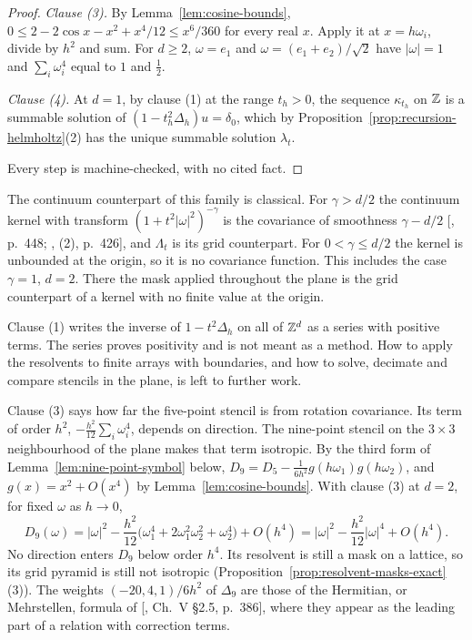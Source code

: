\begin{proof}
\emph{Clause (3).} By Lemma~\ref{lem:cosine-bounds},
$0 \le 2 - 2\cos x - x^2 + x^4/12 \le x^6/360$ for every real $x$. Apply it at $x = h\omega_i$, divide
by $h^2$ and sum. For $d \ge 2$, $\omega = e_1$ and $\omega = (e_1 + e_2)/\sqrt2$ have $|\omega| = 1$
and $\sum_i\omega_i^4$ equal to $1$ and $\tfrac12$.

\emph{Clause (4).} At $d = 1$, by clause (1) at the range $t_h > 0$, the sequence $\kappa_{t_h}$ on
$\mathbb{Z}$ is a summable solution of $(1 - t_h^2\Delta_h)u = \delta_0$, which by
Proposition~\ref{prop:recursion-helmholtz}(2) has the unique summable solution $\lambda_t$.

Every step is machine-checked, with no cited fact.
\end{proof}

The continuum counterpart of this family is classical. For $\gamma > d/2$ the continuum kernel with transform
$(1 + t^2|\omega|^2)^{-\gamma}$ is the \Matern{} covariance of smoothness $\gamma - d/2$
[, p.~448; , (2), p.~426], and $\Lambda_t$ is its grid
counterpart. For $0 < \gamma \le d/2$ the kernel is unbounded at the origin, so it is no covariance
function. This includes the case $\gamma = 1$, $d = 2$. There the mask applied throughout the plane
is the grid counterpart of a kernel with no finite value at the origin.

Clause (1) writes the inverse of $1 - t^2\Delta_h$ on all of $\mathbb{Z}^d$ as a series with positive
terms. The series proves positivity and is not meant as a method. How to apply the resolvents to
finite arrays with boundaries, and how to solve, decimate and compare stencils in the plane, is
left to further work.

Clause (3) says how far the five-point stencil is from rotation covariance. Its term of order $h^2$,
$-\tfrac{h^2}{12}\sum_i\omega_i^4$, depends on direction. The nine-point stencil on the
$3 \times 3$ neighbourhood of the plane makes that term isotropic. By the third form of
Lemma~\ref{lem:nine-point-symbol} below, $D_9 = D_5 - \tfrac{1}{6h^2}g(h\omega_1)g(h\omega_2)$, and
$g(x) = x^2 + O(x^4)$ by Lemma~\ref{lem:cosine-bounds}. With clause (3) at $d = 2$, for fixed
$\omega$ as $h \to 0$,
\[
D_9(\omega) = |\omega|^2 - \frac{h^2}{12}\bigl(\omega_1^4 + 2\omega_1^2\omega_2^2 + \omega_2^4\bigr)
+ O(h^4) = |\omega|^2 - \frac{h^2}{12}|\omega|^4 + O(h^4) .
\]
No direction enters $D_9$ below order $h^4$. Its resolvent is still a mask on a lattice, so its
grid pyramid is still not isotropic (Proposition~\ref{prop:resolvent-masks-exact}(3)). The weights
$(-20, 4, 1)/6h^2$ of $\Delta_9$ are those of the
Hermitian, or Mehrstellen, formula of [, Ch.~V \S 2.5, p.~386], where
they appear as the leading part of a relation with correction terms.

